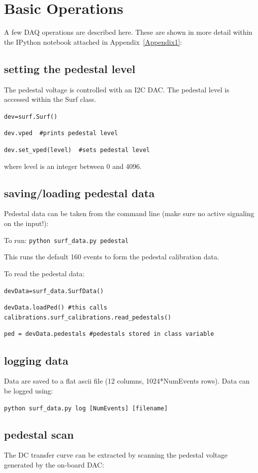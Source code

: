 \documentclass[11pt]{article}
\begin{document}
\section{Basic Operations}
A few DAQ operations are described here. These are shown in more detail within the IPython notebook attached in Appendix~\ref{Appendix1}:

\subsection*{setting the pedestal level}
The pedestal voltage is controlled with an I2C DAC. The pedestal level is accessed within the Surf class.

\verb!dev=surf.Surf()!

\verb!dev.vped  #prints pedestal level!

\verb!dev.set_vped(level)  #sets pedestal level!

\smallskip
where level is an integer between 0 and 4096.

\subsection*{saving/loading pedestal data}
Pedestal data can be taken from the command line (make sure no active signaling on the input!):

To run: \verb!python surf_data.py pedestal!

\smallskip
This runs the default 160 events to form the pedestal calibration data.

To read the pedestal data:

\verb!devData=surf_data.SurfData()!

\verb!devData.loadPed() #this calls calibrations.surf_calibrations.read_pedestals()!

\verb!ped = devData.pedestals #pedestals stored in class variable!


\subsection*{logging data}
Data are saved to a flat ascii file (12 columns, 1024*NumEvents rows). Data can be logged using:

\verb!python surf_data.py log [NumEvents] [filename]!

\subsection*{pedestal scan}
The DC transfer curve can be extracted by scanning the pedestal voltage generated by the on-board DAC:
\end{document}
